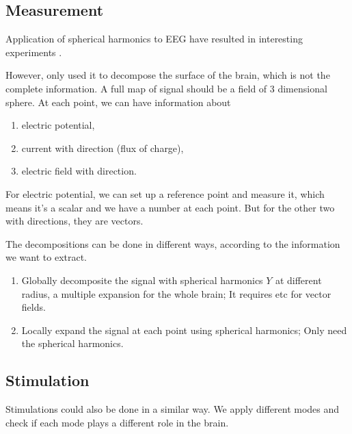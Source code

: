 \documentclass[letterpaper,10pt,english]{sphinxmanual}
\begin{document}
\subsection{Measurement}
\label{\detokenize{neuroscience/signal-decomposition:measurement}}
Application of spherical harmonics to EEG have resulted in interesting experiments \label{\detokenize{neuroscience/signal-decomposition:id1}}{\hyperref[\detokenize{neuroscience/signal-decomposition:sivakumar2016}]{\sphinxcrossref{{[}Sivakumar2016{]}}}}.

However, \label{\detokenize{neuroscience/signal-decomposition:id2}}{\hyperref[\detokenize{neuroscience/signal-decomposition:sivakumar2016}]{\sphinxcrossref{{[}Sivakumar2016{]}}}} only used it to decompose the surface of the brain, which is not the complete information. A full map of signal should be a field of 3 dimensional sphere. At each point, we can have information about
\begin{enumerate}
\item {} 
electric potential,

\item {} 
current with direction (flux of charge),

\item {} 
electric field with direction.

\end{enumerate}

For electric potential, we can set up a reference point and measure it, which means it’s a scalar and we have a number at each point. But for the other two with directions, they are vectors.

The decompositions can be done in different ways, according to the information we want to extract.
\begin{enumerate}
\item {} 
Globally decomposite the signal with spherical harmonics \(Y_{}\) at different radius, a multiple expansion for the whole brain; It requires  etc for vector fields.

\item {} 
Locally expand the signal at each point using spherical harmonics; Only need the spherical harmonics.

\end{enumerate}


\subsection{Stimulation}
\label{\detokenize{neuroscience/signal-decomposition:stimulation}}
Stimulations could also be done in a similar way. We apply different modes and check if each mode plays a different role in the brain.
\end{document}
